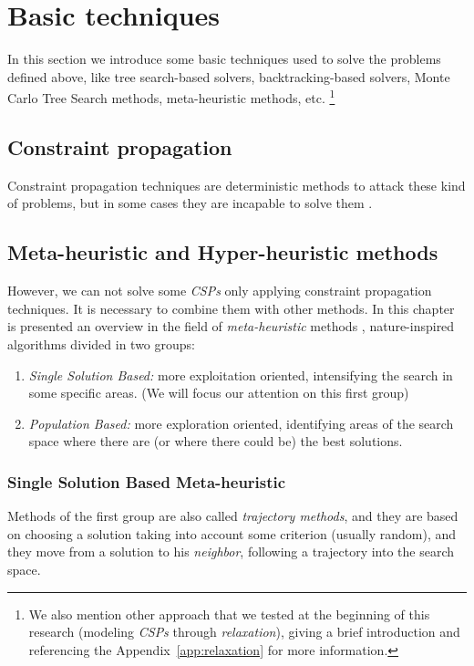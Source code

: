 \documentclass[a4paper]{book} %
\newcommand{\csp}{\textit{CSP}}
\newcommand{\csps}{\csp\textit{s}}
\begin{document}
\section{Basic techniques}

In this section we introduce some basic techniques used to solve the problems defined above, like tree search-based solvers, backtracking-based solvers, Monte Carlo Tree Search methods, meta-heuristic methods, etc. \footnote{We also mention other approach that we tested at the beginning of this research (modeling \csps{} through \textit{relaxation}), giving a brief introduction and referencing the Appendix~\ref{app:relaxation} for more information.}

\subsection{Constraint propagation}

Constraint propagation techniques are deterministic methods to attack these kind of problems, but in some cases they are incapable to solve them \cite{ChristianBessiere2006}. 

\subsection{Meta-heuristic and Hyper-heuristic methods}

However, we can not solve some \csps{} only applying constraint propagation techniques. It is necessary to combine them with other methods. In this chapter is presented an overview in the field of \textit{meta-heuristic} methods \cite{Boussaid2013}, nature-inspired algorithms divided in two groups: 
\begin{enumerate}
    \item {\it Single Solution Based:} more exploitation oriented, intensifying the search in some specific areas. (We will focus our attention on this first group)
    \item {\it Population Based:} more exploration oriented, identifying areas of the search space where there are (or where there could be) the best solutions.
\end{enumerate}

\subsubsection{Single Solution Based Meta-heuristic}

Methods of the first group are also called {\it trajectory methods}, and they are based on choosing a solution taking into account some criterion (usually random), and they move from a solution to his \textit{neighbor}, following a trajectory into the search space.
\end{document}

